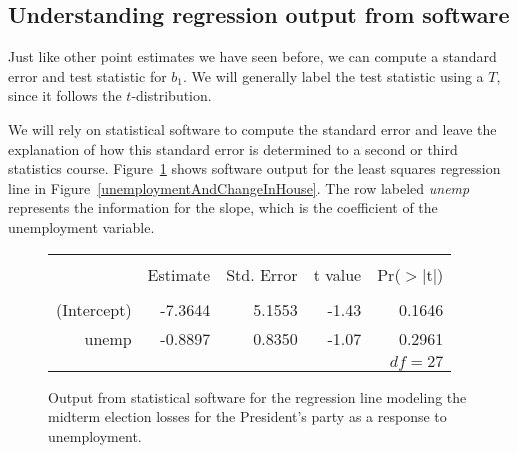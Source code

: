 




\subsection{Understanding regression output from software}
\label{testStatisticForTheSlope}

\newcommand{\midtermshouseDF}{27}

Just like other point estimates we have seen before, we can compute a standard error and test statistic for $b_1$. We will generally label the test statistic using a $T$, since it follows the $t$-distribution.

We will rely on statistical software to compute the standard error and leave the explanation of how this standard error is determined to a second or third statistics course. Figure~\ref{midtermUnempRegTable} shows software output for the least squares regression line in Figure~\ref{unemploymentAndChangeInHouse}. The row labeled \emph{unemp} represents the information for the slope, which is the coefficient of the unemployment variable.

\begin{figure}[ht]
\centering
\begin{tabular}{rrrrr}
  \hline
  \vspace{-3.7mm} & & & & \\
  & Estimate & Std. Error & t value & Pr($>$$|$t$|$) \\ 
  \hline
  \vspace{-3.6mm} & & & & \\
  (Intercept) & -7.3644 & 5.1553 & -1.43 & 0.1646 \\ 
  unemp & -0.8897 & 0.8350 & -1.07 & 0.2961 \\ 
  \hline
  \multicolumn{5}{r}{$df=\midtermshouseDF{}$} \\
\end{tabular}
\caption{Output from statistical software for the regression line modeling the midterm election losses for the President's party as a response to unemployment.}
\label{midtermUnempRegTable}
\end{figure}


